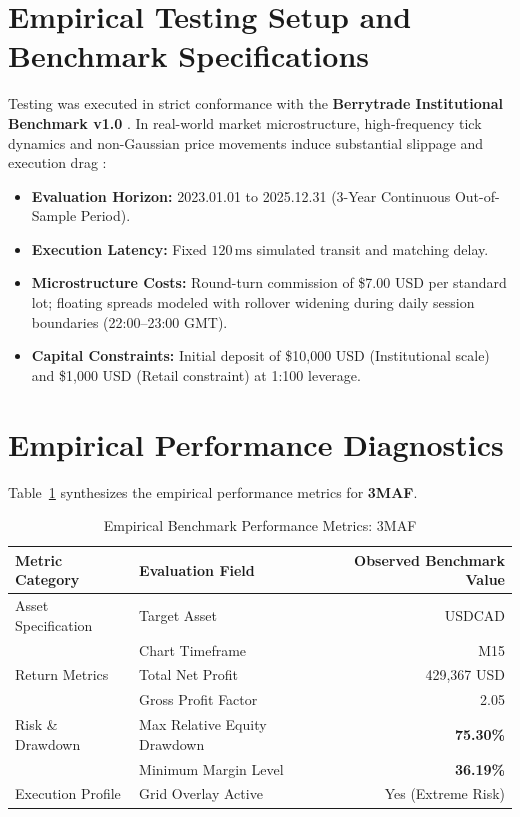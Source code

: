 \documentclass[11pt,a4paper]{article}
\begin{document}
\section{Empirical Testing Setup and Benchmark Specifications}
Testing was executed in strict conformance with the \textbf{Berrytrade Institutional Benchmark v1.0} \cite{artsu2026illusion}. In real-world market microstructure, high-frequency tick dynamics and non-Gaussian price movements induce substantial slippage and execution drag \cite{kyle1985continuous, amihud2002illiquidity, cont2001empirical, mandelbrot1963variation}:
\begin{itemize}
    \item \textbf{Evaluation Horizon:} 2023.01.01 to 2025.12.31 (3-Year Continuous Out-of-Sample Period).
    \item \textbf{Execution Latency:} Fixed $120\,\text{ms}$ simulated transit and matching delay.
    \item \textbf{Microstructure Costs:} Round-turn commission of \$7.00 USD per standard lot; floating spreads modeled with rollover widening during daily session boundaries (22:00--23:00 GMT).
    \item \textbf{Capital Constraints:} Initial deposit of \$10,000 USD (Institutional scale) and \$1,000 USD (Retail constraint) at 1:100 leverage.
\end{itemize}

\section{Empirical Performance Diagnostics}
Table~\ref{tab:metrics} synthesizes the empirical performance metrics for \textbf{3MAF}.

\begin{table}[H]
\centering
\caption{Empirical Benchmark Performance Metrics: 3MAF}
\label{tab:metrics}
\begin{tabular}{llr}
\toprule
\textbf{Metric Category} & \textbf{Evaluation Field} & \textbf{Observed Benchmark Value} \\
\midrule
Asset Specification & Target Asset & USDCAD \\
& Chart Timeframe & M15 \\
Return Metrics & Total Net Profit & 429,367 USD \\
& Gross Profit Factor & 2.05 \\
Risk \& Drawdown & Max Relative Equity Drawdown & \textbf{75.30\%} \\
& Minimum Margin Level & \textbf{36.19\%} \\
Execution Profile & Grid Overlay Active & Yes (Extreme Risk) \\
\bottomrule
\end{tabular}
\end{table}
\end{document}
